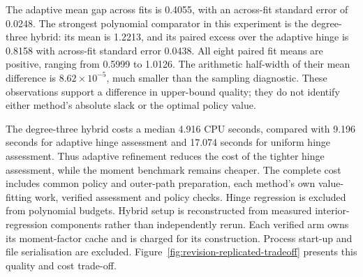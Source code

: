 \documentclass[11pt]{article}
\begin{document}
The adaptive mean gap across fits is 0.4055, with an across-fit standard error of 0.0248. The strongest polynomial comparator in this experiment is the degree-three hybrid: its mean is 1.2213, and its paired excess over the adaptive hinge is 0.8158 with across-fit standard error 0.0438. All eight paired fit means are positive, ranging from 0.5999 to 1.0126. The arithmetic half-width of their mean difference is $8.62\times10^{-5}$, much smaller than the sampling diagnostic. These observations support a difference in upper-bound quality; they do not identify either method's absolute slack or the optimal policy value.

The degree-three hybrid costs a median 4.916 CPU seconds, compared with 9.196 seconds for adaptive hinge assessment and 17.074 seconds for uniform hinge assessment. Thus adaptive refinement reduces the cost of the tighter hinge assessment, while the moment benchmark remains cheaper. The complete cost includes common policy and outer-path preparation, each method's own value-fitting work, verified assessment and policy checks. Hinge regression is excluded from polynomial budgets. Hybrid setup is reconstructed from measured interior-regression components rather than independently rerun. Each verified arm owns its moment-factor cache and is charged for its construction. Process start-up and file serialisation are excluded. Figure~\ref{fig:revision-replicated-tradeoff} presents this quality and cost trade-off.
\end{document}
